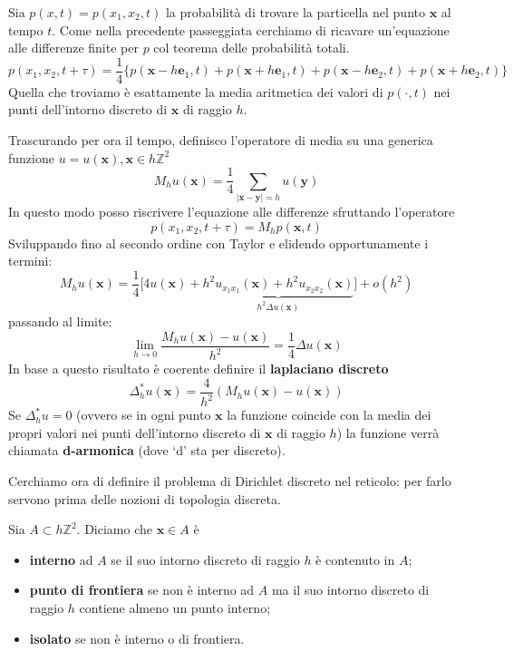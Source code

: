 \documentclass[10pt,a4paper,twoside,openright]{book}
\newcommand{\x}{\mathbf{x}}
\newcommand{\y}{\mathbf{y}}
\begin{document}
Sia $\displaystyle p(x,t) =p(x_{1},x_{2},t)$ la probabilità di trovare la particella nel punto $\x$ al tempo $t$. Come nella precedente passeggiata cerchiamo di ricavare un'equazione alle differenze finite per $p$ col teorema delle probabilità totali.
\begin{equation*}
	p( x_{1},x_{2},t+\tau) =\frac{1}{4}\{p( \x-h\mathbf{e}_{1},t) +p( \x+h\mathbf{e}_{1},t) +p( \x-h\mathbf{e}_{2},t) +p( \x+h\mathbf{e}_{2},t)\}
\end{equation*}
Quella che troviamo è esattamente la media aritmetica dei valori di $p(\cdotp,t)$ nei punti dell'intorno discreto di $\x$ di raggio $h$. 

Trascurando per ora il tempo, definisco l'operatore di media su una generica funzione $u=u(\x),\x\in h\mathbb{Z}^{2}$
\begin{equation*}
	M_{h} u(\x) =\frac{1}{4}\sum _{| \x-\y| =h} u(\y)
\end{equation*}
In questo modo posso riscrivere l'equazione alle differenze sfruttando l'operatore
\begin{equation*}
	p( x_{1},x_{2},t+\tau) =M_{h} p(\x,t)
\end{equation*}
Sviluppando fino al secondo ordine con Taylor e elidendo opportunamente i termini:
\begin{equation*}
M_{h} u(\x) =\frac{1}{4}\bigg[4u(\x) +\underbrace{h^{2} u_{x_{1} x_{1}}(\x) +h^{2} u_{x_{2} x_{2}}(\x)}_{h^{2} \Delta u(\x)}\bigg] +o\left( h^{2}\right)
\end{equation*}
passando al limite:
\begin{equation*}
\lim _{h\rightarrow 0}\frac{M_{h} u(\x) -u(\x)}{h^{2}} =\frac{1}{4} \Delta u(\x)
\end{equation*}
In base a questo risultato è coerente definire il \textbf{laplaciano discreto}
\begin{equation}
	\Delta ^{*}_{h} u(\x) =\frac{4}{h^{2}}(M_{h} u(\x) -u(\x))
\end{equation}
Se $\displaystyle \Delta ^{*}_{h} u=0$ (ovvero se in ogni punto $\x$ la funzione coincide con la media dei propri valori nei punti dell'intorno discreto di $\x$ di raggio $\displaystyle h$) la funzione verrà chiamata \textbf{d-armonica} (dove `d' sta per discreto).

Cerchiamo ora di definire il problema di Dirichlet discreto nel reticolo: per farlo servono prima delle nozioni di topologia discreta.

Sia $\displaystyle A \subset h\mathbb{Z}^{2}$. Diciamo che $\x\in A$ è
\begin{itemize}
	\item \textbf{interno} ad $\displaystyle A$ se il suo intorno discreto di raggio $\displaystyle h$ è contenuto in $\displaystyle A$;
	\item \textbf{punto di frontiera} se non è interno ad $\displaystyle A$ ma il suo intorno discreto di raggio $\displaystyle h$ contiene almeno un punto interno;
	\item \textbf{isolato} se non è interno o di frontiera.
\end{itemize}
\end{document}
